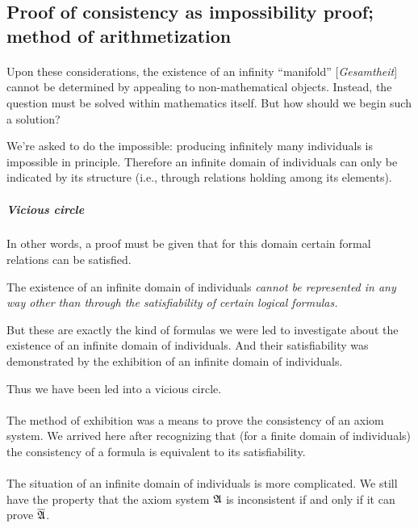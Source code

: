 \subsection{Proof of consistency as impossibility proof; method of arithmetization}

\paragraph{}
Upon these considerations, the existence of an infinity ``manifold''
[\textit{Gesamtheit\/}] cannot be determined by appealing to
non-mathematical objects. Instead, the question must be solved within
mathematics itself. But how should we begin such a solution?

We're asked to do the impossible: producing infinitely many
individuals is impossible in principle. Therefore an infinite domain
of individuals can only be indicated by its structure (i.e., through
relations holding among its elements).

\subparagraph{Vicious circle}
In other words, a proof must be given that for this domain certain
formal relations can be satisfied.

The existence of an infinite domain of individuals \emph{cannot be
represented in any way other than through the satisfiability of
certain logical formulas.}

But these are exactly the kind of formulas we were led to investigate
about the existence of an infinite domain of individuals.
And their satisfiability was demonstrated by the exhibition of an
infinite domain of individuals.

Thus we have been led into a vicious circle.

\paragraph{}
The method of exhibition was a means to prove the
consistency of an axiom system. We arrived here after recognizing that
(for a finite domain of individuals) the consistency of a formula is
equivalent to its satisfiability. 

\paragraph{}
The situation of an infinite domain of individuals is more complicated.
We still have the property that the axiom system $\mathfrak{A}$ is
inconsistent if and only if it can prove $\overline{\mathfrak{A}}$.

